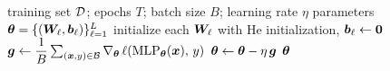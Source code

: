 \begin{algorithmic}[1]
  \Require training set ${\mathcal{D}}$; epochs $T$; batch size $B$; learning rate $\eta$
  \Ensure parameters ${\bm{\theta}} = \{({\bm{W}}_\ell, {\bm{b}}_\ell)\}_{\ell=1}^{L}$
  \State initialize each ${\bm{W}}_\ell$ with He initialization, ${\bm{b}}_\ell \gets {\bm{0}}$
      \State ${\bm{g}} \gets \dfrac{1}{B} \sum_{({\bm{x}}, y) \in {\mathcal{B}}}
        \nabla_{{\bm{\theta}}}\, \ell\!\left(\mathrm{MLP}_{{\bm{\theta}}}({\bm{x}}),\, y\right)$
      \State ${\bm{\theta}} \gets {\bm{\theta}} - \eta\, {\bm{g}}$ 
    \EndFor
  \EndFor
  \State \Return ${\bm{\theta}}$
\end{algorithmic}
